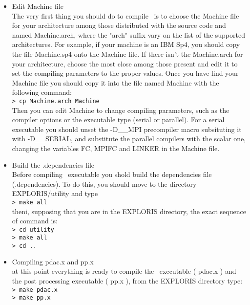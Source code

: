 \begin{itemize}

\item Edit Machine file \\
      The very first thing you should do to compile \PDAC\ is to choose
      the Machine file for your architecture among those distributed with
      the source code and named Machine.arch, where the "arch" suffix
      vary on the list of the supported architectures. For example, if
      your machine is an IBM Sp4, you should copy the file Machine.sp4
      onto the Machine file. If there isn't the Machine.arch for 
      your architecture, choose the most close among those present
      and edit it to set the compiling parameters to the proper values.
      Once you have find your Machine file you should copy it into the
      file named Machine with the following command:\\
      {\tt > cp Machine.arch Machine}\\
      Then you can edit Machine to change compiling parameters,
      such as the compiler options or the executable type (serial or parallel).
      For a serial executable you should unset the -D\_\_MPI precompiler macro
      subsituting it with -D\_\_SERIAL, and substitute the parallel compilers
      with the scalar one, changing the variables FC, MPIFC and LINKER
      in the Machine file.

\item Build the .dependencies file\\
      Before compiling \PDAC\ executable you shold build the 
      dependencies file (.dependencies). To do this, you should
      move to the directory  EXPLORIS/utility and type \\
      {\tt > make all}\\
      theni, supposing that you are in the EXPLORIS directory, 
      the exact sequence of command is:\\
      {\tt > cd utility}\\
      {\tt > make all}\\
      {\tt > cd ..}\\

\item Compiling pdac.x and pp.x\\
      at this point everything is ready to compile the \PDAC\ executable
      ( pdac.x ) and the post processing executable ( pp.x ), from
      the EXPLORIS directory type:\\
      {\tt > make pdac.x}\\
      {\tt > make pp.x}\\


\end{itemize}
